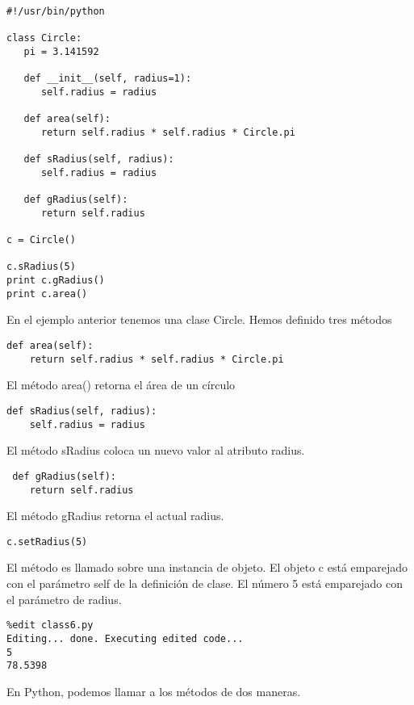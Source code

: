 \documentclass[twoside,10.5pt]{article}%
\begin{document}
\vspace{0.3cm}

\begin{verbatim}
#!/usr/bin/python

class Circle:
   pi = 3.141592

   def __init__(self, radius=1):
      self.radius = radius 

   def area(self):
      return self.radius * self.radius * Circle.pi

   def sRadius(self, radius):
      self.radius = radius

   def gRadius(self):
      return self.radius

c = Circle()

c.sRadius(5)
print c.gRadius()
print c.area()
\end{verbatim}


En el ejemplo anterior tenemos una clase Circle. Hemos definido tres m\'etodos

\begin{verbatim}
def area(self):
    return self.radius * self.radius * Circle.pi
\end{verbatim}


El m\'etodo area() retorna el \'area de un c\'irculo

\begin{verbatim}
def sRadius(self, radius):
    self.radius = radius
\end{verbatim}

El m\'etodo sRadius coloca un nuevo valor al atributo radius.

\begin{verbatim}
 def gRadius(self):
    return self.radius
\end{verbatim}

El m\'etodo gRadius retorna el actual radius.

\begin{verbatim}
c.setRadius(5)
\end{verbatim}

El m\'etodo es llamado sobre una instancia de objeto. El objeto c est\'a emparejado con el par\'ametro self de la definici\'on de clase. El n\'umero 5 est\'a emparejado con el par\'ametro de radius.

\begin{verbatim}
%edit class6.py
Editing... done. Executing edited code...
5
78.5398
\end{verbatim}


En Python, podemos llamar a los m\'etodos de dos maneras. 
\end{document}
